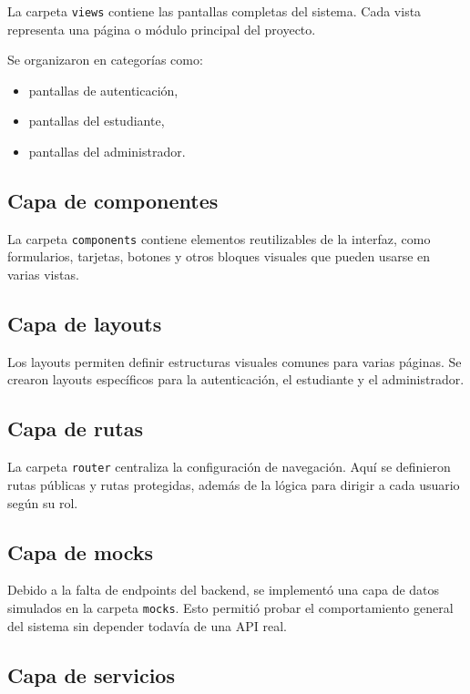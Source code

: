 \documentclass[12pt]{article}
\begin{document}
La carpeta \texttt{views} contiene las pantallas completas del sistema. Cada vista representa una página o módulo principal del proyecto.

Se organizaron en categorías como:

\begin{itemize}
    \item pantallas de autenticación,
    \item pantallas del estudiante,
    \item pantallas del administrador.
\end{itemize}

\subsection{Capa de componentes}

La carpeta \texttt{components} contiene elementos reutilizables de la interfaz, como formularios, tarjetas, botones y otros bloques visuales que pueden usarse en varias vistas.

\subsection{Capa de layouts}

Los layouts permiten definir estructuras visuales comunes para varias páginas. Se crearon layouts específicos para la autenticación, el estudiante y el administrador.

\subsection{Capa de rutas}

La carpeta \texttt{router} centraliza la configuración de navegación. Aquí se definieron rutas públicas y rutas protegidas, además de la lógica para dirigir a cada usuario según su rol.

\subsection{Capa de mocks}

Debido a la falta de endpoints del backend, se implementó una capa de datos simulados en la carpeta \texttt{mocks}. Esto permitió probar el comportamiento general del sistema sin depender todavía de una API real.

\subsection{Capa de servicios}
\end{document}
